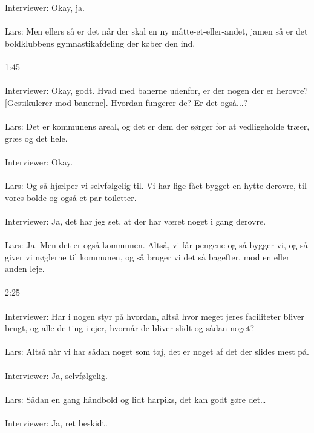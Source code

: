 \\\\
Interviewer: Okay, ja.
\\\\
Lars: Men ellers så er det når der skal en ny måtte-et-eller-andet, jamen så er det boldklubbens gymnastikafdeling der køber den ind.
\\\\
1:45
\\\\
Interviewer: Okay, godt. Hvad med banerne udenfor, er der nogen der er herovre? [Gestikulerer mod banerne]. Hvordan fungerer de? Er det også...?
\\\\
Lars: Det er kommunens areal, og det er dem der sørger for at vedligeholde træer, græs og det hele.
\\\\
Interviewer: Okay.
\\\\
Lars: Og så hjælper vi selvfølgelig til. Vi har lige fået bygget en hytte derovre, til vores bolde og også et par toiletter.
\\\\
Interviewer: Ja, det har jeg set, at der har været noget i gang derovre.
\\\\
Lars: Ja. Men det er også kommunen. Altså, vi får pengene og så bygger vi, og så giver vi nøglerne til kommunen, og så bruger vi det så bagefter, mod en eller anden leje.
\\\\
2:25
\\\\
Interviewer: Har i nogen styr på hvordan, altså hvor meget jeres faciliteter bliver brugt, og alle de ting i ejer, hvornår de bliver slidt og sådan noget?
\\\\
Lars: Altså når vi har sådan noget som tøj, det er noget af det der slides mest på.
\\\\
Interviewer: Ja, selvfølgelig.
\\\\
Lars: Sådan en gang håndbold og lidt harpiks, det kan godt gøre det…
\\\\
Interviewer: Ja, ret beskidt.
\\\\
[Ler sammen]
\\\\
